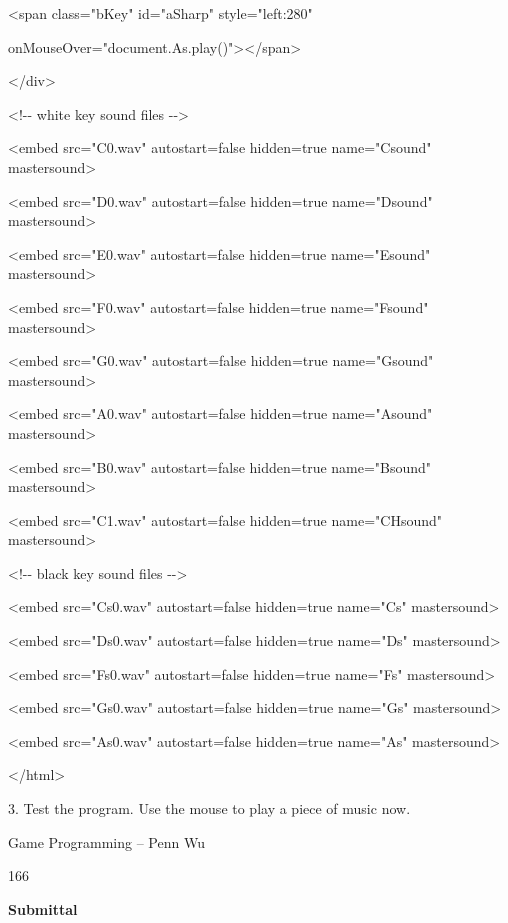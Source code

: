 \documentclass[
]{article}
\begin{document}
\textless span class="bKey" id="aSharp" style="left:280"

onMouseOver="document.As.play()"\textgreater\textless/span\textgreater{}

\textless/div\textgreater{}

\textless!-\/- white key sound files -\/-\textgreater{}

\textless embed src="C0.wav" autostart=false hidden=true name="Csound"
mastersound\textgreater{}

\textless embed src="D0.wav" autostart=false hidden=true name="Dsound"
mastersound\textgreater{}

\textless embed src="E0.wav" autostart=false hidden=true name="Esound"
mastersound\textgreater{}

\textless embed src="F0.wav" autostart=false hidden=true name="Fsound"
mastersound\textgreater{}

\textless embed src="G0.wav" autostart=false hidden=true name="Gsound"
mastersound\textgreater{}

\textless embed src="A0.wav" autostart=false hidden=true name="Asound"
mastersound\textgreater{}

\textless embed src="B0.wav" autostart=false hidden=true name="Bsound"
mastersound\textgreater{}

\textless embed src="C1.wav" autostart=false hidden=true name="CHsound"
mastersound\textgreater{}

\textless!-\/- black key sound files -\/-\textgreater{}

\textless embed src="Cs0.wav" autostart=false hidden=true name="Cs"
mastersound\textgreater{}

\textless embed src="Ds0.wav" autostart=false hidden=true name="Ds"
mastersound\textgreater{}

\textless embed src="Fs0.wav" autostart=false hidden=true name="Fs"
mastersound\textgreater{}

\textless embed src="Gs0.wav" autostart=false hidden=true name="Gs"
mastersound\textgreater{}

\textless embed src="As0.wav" autostart=false hidden=true name="As"
mastersound\textgreater{}

\textless/html\textgreater{}

3. Test the program. Use the mouse to play a piece of music now.

Game Programming -- Penn Wu

166

\protect\hypertarget{index_split_010.htmlux5cux23p167}{}{}\textbf{Submittal}
\end{document}
